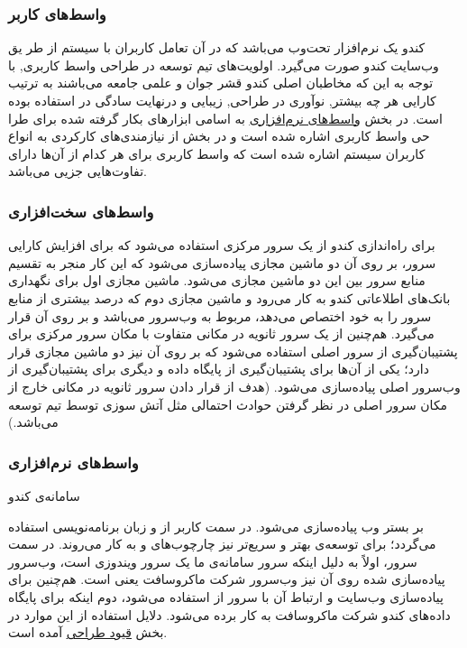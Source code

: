 \documentclass{report}
\begin{document}
     \subsubsection{واسط‌های کاربر}
     کندو یک نرم‌افزار تحت‌وب می‌باشد که در آن تعامل کاربران با سیستم از طر یق وب‌سایت کندو صورت می‌گیرد. اولویت‌های تیم توسعه در طراحی واسط کاربری, با توجه به این که مخاطبان اصلی کندو قشر جوان و علمی  جامعه می‌باشند به ترتیب کارایی هر چه بیشتر, نوآوری در طراحی,  زیبایی و درنهایت سادگی در استفاده بوده است. در بخش
\hyperlink{ee}{\underline{واسط‌های نرم‌افزاری}}
     به اسامی ابزارهای  بکار گرفته شده برای طرا حی واسط کاربری اشاره شده است
 و در بخش
\hyperlink{ww}{\underline{}}
 از نیازمندی‌های کارکردی به انواع کاربران سیستم اشاره شده است که واسط کاربری برای هر کدام از آن‌ها دارای تفاوت‌هایی جزیی می‌باشد. 
 
\subsubsection{واسط‌های سخت‌افزاری}
برای راه‌اندازی کندو از یک سرور مرکزی استفاده می‌شود که برای افزایش کارایی سرور، بر روی آن دو ماشین مجازی پیاده‌سازی می‌شود که این کار منجر به تقسیم منابع سرور بین این دو ماشین مجازی می‌شود. ماشین مجازی اول برای نگهداری بانک‌های اطلاعاتی کندو به کار می‌رود و ماشین  مجازی دوم که درصد بیشتری از منابع سرور را به خود اختصاص می‌دهد، مربوط به وب‌سرور می‌باشد و بر روی آن قرار می‌گیرد. هم‌چنین از یک سرور ثانویه در مکانی متفاوت با مکان سرور مرکزی برای پشتیبان‌گیری 
از سرور اصلی استفاده می‌شود که بر روی آن نیز دو ماشین مجازی قرار دارد؛ یکی از آن‌ها برای پشتیبان‌گیری از پایگاه داده و دیگری برای پشتیبان‌گیری از وب‌سرور اصلی پیاده‌سازی می‌شود. (هدف از قرار دادن سرور ثانویه در مکانی خارج از مکان سرور اصلی در نظر گرفتن حوادث احتمالی مثل آتش سوزی توسط تیم توسعه می‌باشد.)
\subsubsection{واسط‌های نرم‌افزاری}
\hypertarget{ee}{سامانه‌ی کندو}
 بر بستر وب پیاده‌سازی می‌شود. در سمت کاربر
    از
  و زبان برنامه‌نویسی
 استفاده می‌گردد؛ برای توسعه‌ی بهتر و سریع‌تر نیز چارچوب‌های
     و 
      به کار می‌روند. 
    در سمت سرور،  اولاً به دلیل اینکه سرور سامانه‌ی ما یک سرور ویندوزی است، وب‌سرور پیاده‌سازی شده روی آن نیز وب‌سرور شرکت ماکروسافت یعنی 
     است. هم‌چنین برای پیاده‌سازی وب‌سایت و ارتباط آن با سرور
 از 
 استفاده می‌شود، دوم اینکه برای پایگاه‌ داده‌های کندو
   شرکت ماکروسافت به کار برده می‌شود.
   دلایل استفاده از این موارد در بخش
\hyperlink{gg}{\underline{قیود طراحی}}
     آمده است.
\end{document}
